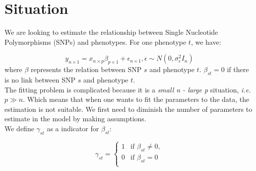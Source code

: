 \section{Situation}
We are looking to estimate the relationship between Single Nucleotide Polymorphisms (SNPs) and phenotypes. For one phenotype $t$, we have:

\begin{equation}
y_{n \times 1} = x_{n\times p} \beta_{p\times 1} + \epsilon_{n \times 1},  \epsilon \sim N \left( 0, \sigma_{\epsilon}^2I_n \right)
\label{eq:model}
\end{equation}
where $\beta$ represents the relation between SNP $s$ and phenotype $t$. $\beta_{st} = 0$ if there is no link between SNP $s$ and phenotype $t$.\\
\newline
The fitting problem is complicated because it is a\textit{ small n - large p }situation, \textit{i.e.} $p \gg n$. Which means that when one wants to fit the parameters to the data, the estimation is not suitable. We first need to diminish the number of parameters to estimate in the model by making assumptions.\\
\newline
We define $\gamma_{st}$ as a indicator for $\beta_{st}$:

\begin{equation}
\gamma_{st} = \left\lbrace \begin{array}{ll}
1 & \text{if } \beta_{st} \neq 0,\\
0 & \text{if } \beta_{st}  = 0\\
\end{array}\right.
\label{eq:gamma}
\end{equation}

